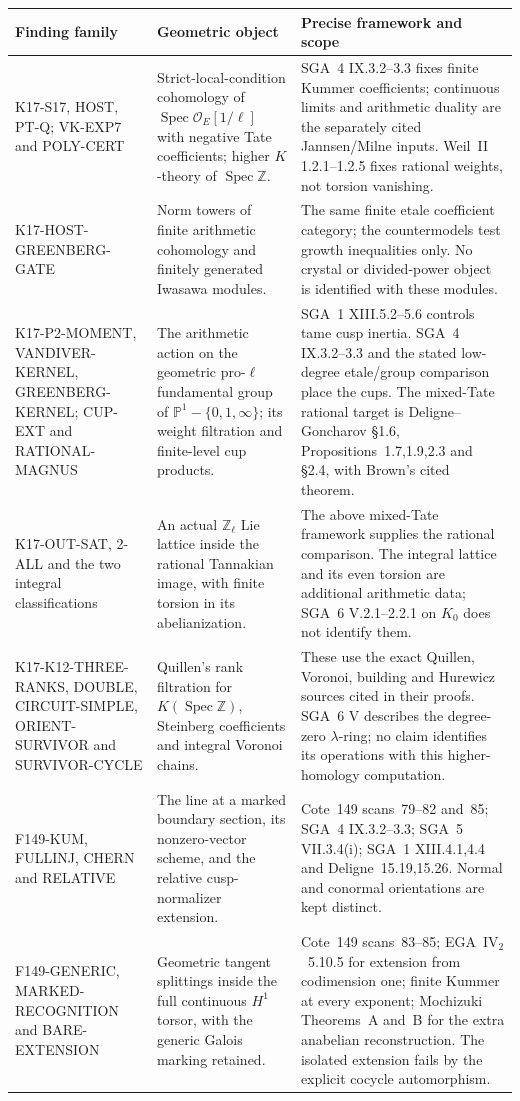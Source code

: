 \small
\begin{longtable}{p{}p{}p{}}
\toprule
Finding family & Geometric object & Precise framework and scope\\
\midrule
\endhead
K17-S17, HOST, PT-Q; VK-EXP7 and POLY-CERT &
Strict-local-condition cohomology of
$\operatorname{Spec}\mathcal O_E[1/\ell]$ with negative Tate
coefficients; higher $K$-theory of $\operatorname{Spec}\mathbb Z$. &
SGA~4 IX.3.2--3.3 fixes finite Kummer coefficients; continuous limits
and arithmetic duality are the separately cited Jannsen/Milne inputs.
Weil~II 1.2.1--1.2.5 fixes rational weights, not torsion vanishing.\\
K17-HOST-GREENBERG-GATE &
Norm towers of finite arithmetic cohomology and finitely generated
Iwasawa modules. &
The same finite etale coefficient category; the countermodels test
growth inequalities only. No crystal or divided-power object is
identified with these modules.\\
K17-P2-MOMENT, VANDIVER-KERNEL, GREENBERG-KERNEL;
CUP-EXT and RATIONAL-MAGNUS &
The arithmetic action on the geometric pro-$\ell$ fundamental group
of $\mathbb P^1-\{0,1,\infty\}$; its weight filtration and
finite-level cup products. &
SGA~1 XIII.5.2--5.6 controls tame cusp inertia. SGA~4 IX.3.2--3.3
and the stated low-degree etale/group comparison place the cups.
The mixed-Tate rational target is Deligne--Goncharov \S1.6,
Propositions~1.7,1.9,2.3 and \S2.4, with Brown's cited theorem.\\
K17-OUT-SAT, 2-ALL and the two integral classifications &
An actual $\mathbb Z_\ell$ Lie lattice inside the rational
Tannakian image, with finite torsion in its abelianization. &
The above mixed-Tate framework supplies the rational comparison.
The integral lattice and its even torsion are additional arithmetic
data; SGA~6 V.2.1--2.2.1 on $K_0$ does not identify them.\\
K17-K12-THREE-RANKS, DOUBLE, CIRCUIT-SIMPLE,
ORIENT-SURVIVOR and SURVIVOR-CYCLE &
Quillen's rank filtration for $K(\operatorname{Spec}\mathbb Z)$,
Steinberg coefficients and integral Voronoi chains. &
These use the exact Quillen, Voronoi, building and Hurewicz sources
cited in their proofs. SGA~6 V describes the degree-zero
$\lambda$-ring; no claim identifies its operations with this
higher-homology computation.\\
F149-KUM, FULLINJ, CHERN and RELATIVE &
The line at a marked boundary section, its nonzero-vector scheme,
and the relative cusp-normalizer extension. &
Cote~149 scans~79--82 and~85; SGA~4 IX.3.2--3.3;
SGA~5 VII.3.4(i); SGA~1 XIII.4.1,4.4 and Deligne~15.19,15.26.
Normal and conormal orientations are kept distinct.\\
F149-GENERIC, MARKED-RECOGNITION and BARE-EXTENSION &
Geometric tangent splittings inside the full continuous
$H^1$ torsor, with the generic Galois marking retained. &
Cote~149 scans~83--85; EGA~$\mathrm{IV}_2$~5.10.5 for extension
from codimension one; finite Kummer at every exponent;
Mochizuki Theorems~A and~B for the extra anabelian reconstruction.
The isolated extension fails by the explicit cocycle automorphism.\\
\bottomrule
\end{longtable}
\normalsize

